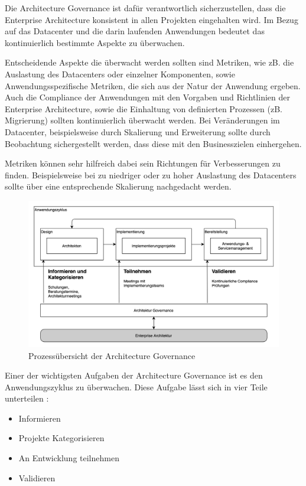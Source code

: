 Die Architecture Governance ist dafür verantwortlich sicherzustellen, dass die Enterprise Architecture konsistent in allen Projekten eingehalten wird. Im Bezug auf das Datacenter und die darin laufenden Anwendungen bedeutet das kontinuierlich bestimmte Aspekte zu überwachen.

Entscheidende Aspekte die überwacht werden sollten sind Metriken, wie zB. die Auslastung des Datacenters oder einzelner Komponenten, sowie Anwendungsspezifische Metriken, die sich aus der Natur der Anwendung ergeben. Auch die Compliance der Anwendungen mit den Vorgaben und Richtlinien der Enterprise Architecture, sowie die Einhaltung von definierten Prozessen (zB. Migrierung) sollten kontinuierlich überwacht werden. Bei Veränderungen im Datacenter, beispielsweise durch Skalierung und Erweiterung sollte durch Beobachtung sichergestellt werden, dass diese mit den Businesszielen einhergehen. \cite{datacenter-architecture} 

Metriken können sehr hilfreich dabei sein Richtungen für Verbesserungen zu finden. Beispielsweise bei zu niedriger oder zu hoher Auslastung des Datacenters sollte über eine entsprechende Skalierung nachgedacht werden.

\begin{figure}
	\centering
	\includegraphics[width=\linewidth]{img/governance}
	\caption{Prozessübersicht der Architecture Governance}
	\label{fig:governance}
\end{figure}

Einer der wichtigsten Aufgaben der Architecture Governance ist es den Anwendungszyklus zu überwachen. Diese Aufgabe lässt sich in vier Teile unterteilen \cite{governance-approach}:

\begin{itemize}
	\item Informieren
	\item Projekte Kategorisieren
	\item An Entwicklung teilnehmen
	\item Validieren
\end{itemize}

